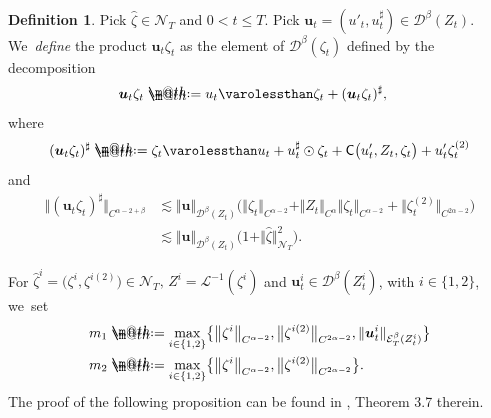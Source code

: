 \documentclass[10pt]{amsart}
\makeatletter
\theoremstyle{definition}
\newtheorem{defn}[thm]{Definition}
\newcommand{\mcD}{\mathcal{D}}
\newcommand{\mcE}{\mathcal{E}}
\newcommand{\mcN}{\mathcal{N}}
\newcommand{\bsu}{\boldsymbol{u}}
\newcommand*{\defeq}{\mathrel{\rlap{%
\raisebox{0.3ex}{$\m@th\cdot$}}%
\raisebox{-0.3ex}{$\m@th\cdot$}}%
=}
\newcommand{\norme}[1]{\Vert #1 \Vert}
\newcommand{\scrL}{\mathscr{L}}
\makeatother
\begin{document}
\begin{defn} \label{produit}
Pick $\widehat\zeta\in{{\boldsymbol{\mcN}}_T}$ and $0<t\leq T$. Pick $\bsu_t = (u'_t,u^\sharp_t) \in \mcD^\beta(Z_t)$. We~\emph{define} the product $\bsu_t\zeta_t$ as the element of $\mcD^\beta(\zeta_t)$ defined by the decomposition
\begin{equation*} \begin{split}
\bsu_t\zeta_t &\defeq u_t \varolessthan \zeta_t + (\bsu_t\zeta_t)^\sharp,
\end{split} \end{equation*}
where
\[
(\bsu_t\zeta_t)^\sharp \defeq \zeta_t \varolessthan u_t + u_t^\sharp\odot \zeta_t + \mathsf{C}\bigl(u_t', Z_t, \zeta_t\bigr) + u_t'\zeta^{(2)}_t
\]
and
\begin{equation} \label{EqEstimateProductSharp} \begin{split}
\norme{(\bsu_t\zeta_t)^\sharp}_{C^{\alpha-2+\beta}} &\lesssim \norme\bsu_{\mathcal{D}^\beta(Z_t)}\bigl( \norme{\zeta_t}_{C^{\alpha-2}} + \norme{Z_t}_{C^\alpha} \norme{\zeta_t}_{C^{\alpha-2}} + \big\Vert\zeta^{(2)}_t\big\Vert_{C^{2\alpha-2}}\bigr) \\
& \lesssim \norme\bsu_{\mathcal{D}^\beta(Z_t)} \bigl(1+\Vert \widehat{\zeta}\Vert_{{\boldsymbol{\mcN}}_T}^2\bigr).
\end{split} \end{equation}
\end{defn}

For $\widehat\zeta^i = \bigl(\zeta^i,\zeta^{i(2)}\bigr)\in{{\boldsymbol{\mcN}}_T}, \,Z^i = \scrL^{-1}(\zeta^i)$ and $\bsu^i_t\in\mcD^\beta(Z^i_t)$, with $i\in\{1,2\}$, we~set
\begin{equation*} \begin{split}
m_1 &\defeq \underset{i\in\{1,2\}}{\max}\bigl\{ {\big\Vert} {\zeta^i}\big\Vert_{C^{\alpha-2}}, {\big\Vert} {\zeta^{i(2)}}\big\Vert_{C^{2\alpha-2}}, \norme{\bsu^i_t}_{\mcE^\beta_T(Z^i_t)} \bigr\} \\
m_2 & \defeq \underset{i\in\{1,2\}}{\max}\bigl\{ {\big\Vert} {\zeta^i}\big\Vert_{C^{\alpha-2}}, {\big\Vert} {\zeta^{i(2)}}\big\Vert_{C^{2\alpha-2}}\bigr\}.
\end{split} \end{equation*}
The proof of the following proposition can be found in \cite{GIP}, Theorem 3.7 therein.
\end{document}

